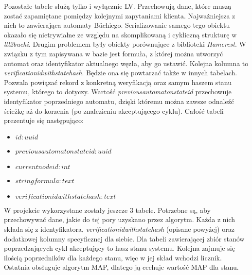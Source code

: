 Pozostałe tabele służą tylko i wyłącznie LV.
Przechowują dane, które muszą zostać zapamiętane pomiędzy kolejnymi zapytaniami klienta.
Najważniejsza z nich to zawierająca automaty Büchiego.
Serializowanie samego tego obiektu okazało się nietrywialne ze względu na skomplikowaną i cykliczną strukturę w \textit{ltl2buchi}.
Drugim problemem były obiekty porównujące z biblioteki \textit{Hamcrest}.
W związku z tym zapisywana w bazie jest formuła, z której można utworzyć automat oraz identyfikator aktualnego węzła, aby go ustawić.
Kolejna kolumna to \textit{verificationidwithstatehash}.
Będzie ona się powtarzać także w innych tabelach.
Pozwala powiązać rekord z konkretną weryfikacją oraz samym haszem stanu systemu, którego to dotyczy.
Wartość \textit{previousautomatonstateid} przechowuje identyfikator poprzedniego automatu, dzięki któremu można zawsze odnaleźć ścieżkę aż do korzenia (po znalezieniu akceptującego cyklu).
Całość tabeli prezentuje się następująco:
\begin{itemize}
    \setlength\itemsep{-0.1cm}
    \item $ id: uuid $
    \item $ previousautomatonstateid: uuid $
    \item $ currentnodeid: int $
    \item $ stringformula: text $
    \item $ verificationidwithstatehash: text $
\end{itemize}

W projekcie wykorzystane zostały jeszcze 3 tabele.
Potrzebne są, aby przechowywać dane, jakie do tej pory uzyskano przez algorytm.
Każda z nich składa się z identyfikatora, \textit{verificationidwithstatehash} (opisane powyżej) oraz dodatkowej kolumny specyficznej dla siebie.
Dla tabeli zawierającej zbiór stanów poprzedzających cykl akceptujący to hasz stanu systemu.
Kolejna zajmuje się ilością poprzedników dla każdego stanu, więc w jej skład wchodzi licznik.
Ostatnia obsługuje algorytm MAP, dlatego ją cechuje wartość MAP dla stanu.
